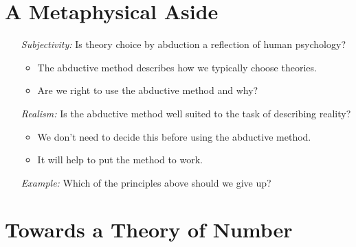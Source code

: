 \documentclass[a4paper, 11pt]{article} %
\begin{document}
\section*{A Metaphysical Aside}

\begin{enumerate}
  \item[\it Subjectivity:] Is theory choice by abduction a reflection of human psychology?
    \begin{itemize}[leftmargin=-.2in]
      \item The abductive method describes how we typically choose theories.
      \item Are we right to use the abductive method and why?
    \end{itemize}
  \item[\it Realism:] Is the abductive method well suited to the task of describing reality?
    \begin{itemize}[leftmargin=-.2in]
      \item We don't need to decide this before using the abductive method.
      \item It will help to put the method to work.
    \end{itemize}
  \item[\it Example:] Which of the principles above should we give up?
\end{enumerate}





\section*{Towards a Theory of Number}
\end{document}
